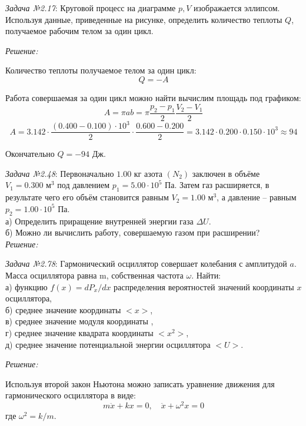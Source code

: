 \documentclass[14pt,final,titlepage]{hedsemwork}
\begin{document}
\maketitle
\emph{Задача №2.17}: Круговой процесс на диаграмме \( p, V \) изображается 
эллипсом. Используя данные, приведенные на рисунке, определить количество 
теплоты \( Q \), получаемое рабочим телом за один цикл.

\emph{Решение:}

Количество теплоты получаемое телом за один цикл:
\[
	Q = -A
\]

Работа совершаемая за один цикл можно найти вычислим площадь под графиком:
\[
	A = \pi ab = \pi\frac{p_2 - p_1}{2}\frac{V_2 - V_1}{2}
\]
\[
	A = 3.142\cdot\frac{(0.400-0.100)\cdot10^3}{2}\cdot\frac{0.600-0.200}{2} =
		3.142\cdot0.200\cdot0.150\cdot10^3 \approx 94
\]

Окончательно \( Q = -94 \) Дж.

\newpage
\emph{Задача №2.48}: Первоначально \( 1.00 \) кг азота \((N_2)\) заключен 
в объёме \( V_1 = 0.300 \text{ м}^3 \) под давлением 
\( p_1 = 5.00\cdot10^5 \) Па. Затем газ расширяется, в результате чего 
его объём становится равным \( V_2 = 1.00 \text{ м}^3 \), а давление -- 
равным \( p_2 = 1.00\cdot10^5 \) Па. \\
а) Определить приращение внутренней энергии газа \( \Delta U \). \\
б) Можно ли вычислить работу, совершаемую газом при расширении? \\

\emph{Решение:}

\newpage
\emph{Задача №2.78}: Гармонический осциллятор совершает колебания с 
амплитудой \( a \). Масса осциллятора равна m, собственная частота 
\( \omega \). Найти: \\
а) функцию \( f(x) = dP_x/dx \) распределения вероятностей значений 
	координаты \( x \) осциллятора, \\
б) среднее значение координаты \(<x>\), \\
в) среднее значение модуля координаты \(<|x|>\), \\
г) среднее значение квадрата координаты \(<x^2>\), \\
д) среднее значение потенциальной энергии осциллятора \(<U>\).

\emph{Решение:}

Используя второй закон Ньютона можно записать уравнение движения для 
гармонического осциллятора в виде:
\[
	m\ddot{x} + kx = 0, \quad
	\ddot{x} + \omega^2 x = 0
\]
где \( \omega^2 = k/m \).
\end{document}
